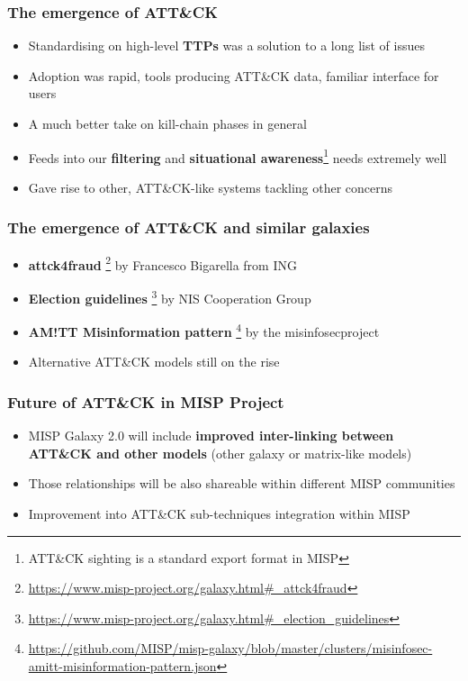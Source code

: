 \begin{frame}
  \frametitle{The emergence of ATT\&CK}
  \begin{itemize}
    \item Standardising on high-level {\bf TTPs} was a solution to a long list of issues
    \item Adoption was rapid, tools producing ATT\&CK data, familiar interface for users
    \item A much better take on kill-chain phases in general
    \item Feeds into our {\bf filtering} and {\bf situational awareness}\footnote{ATT\&CK sighting is a standard export format in MISP} needs extremely well
    \item Gave rise to other, ATT\&CK-like systems tackling other concerns
  \end{itemize}
\end{frame}

\begin{frame}
  \frametitle{The emergence of ATT\&CK and similar galaxies}
    \begin{itemize}
      \item {\bf attck4fraud} \footnote{\url{https://www.misp-project.org/galaxy.html\#_attck4fraud}} by Francesco Bigarella from ING
      \item {\bf Election guidelines} \footnote{\url{https://www.misp-project.org/galaxy.html\#_election_guidelines}} by NIS Cooperation Group
      \item {\bf AM!TT Misinformation pattern}  \footnote{\url{https://github.com/MISP/misp-galaxy/blob/master/clusters/misinfosec-amitt-misinformation-pattern.json}} by the misinfosecproject
      \item Alternative ATT\&CK models still on the rise
    \end{itemize}
\end{frame}


\begin{frame}
        \frametitle{Future of ATT\&CK in MISP Project}
        \begin{itemize}
                \item MISP Galaxy 2.0 will include {\bf improved inter-linking between ATT\&CK and other models} (other galaxy or matrix-like models)
                \item Those relationships will be also shareable within different MISP communities
                \item Improvement into ATT\&CK sub-techniques integration within MISP
        \end{itemize}

\end{frame}

